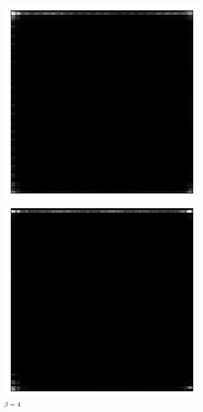 \begin{figure}[h!]
\centering
\captionsetup{justification=centering}
\begin{multicols}{3}
    \includegraphics[scale=0.4]{figures/results/naive_average/beta_1_prior_sample_2.png}
    \caption{$\beta=1$}
    \includegraphics[scale=0.4]{figures/results/naive_average/beta_4_prior_sample_0.png}
    \caption{$\beta=4$}

\end{multicols}
\end{figure}
